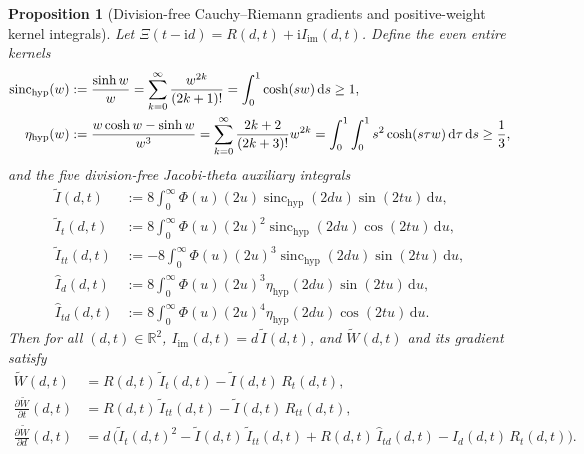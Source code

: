 \documentclass[11pt,a4paper,reqno]{amsart}
\newtheorem{proposition}[theorem]{Proposition}
\theoremstyle{definition}
\theoremstyle{remark}
\numberwithin{equation}{section}
\newcommand{\dd}{\mathrm{d}}
\newcommand{\ii}{\mathrm{i}}
\newcommand{\Wtil}{\widetilde{W}}
\newcommand{\sinch}{\operatorname{sinc}_{\mathrm{hyp}}}
\newcommand{\etah}{\eta_{\mathrm{hyp}}}
\newcommand{\fac}{\mathclose{\mathchar"0021}}
\begin{document}
\begin{proposition}[Division-free Cauchy--Riemann gradients and positive-weight kernel integrals]\label{prop:cr_gradients}
Let $\Xi(t-\ii d) = R(d,t) + \ii I_{\mathrm{im}}(d,t)$. Define the even entire kernels
\begin{equation}\label{eq:sinch_etah_def}
\begin{aligned}
\sinch(w) &:= \frac{\sinh w}{w} = \sum_{k=0}^\infty \frac{w^{2k}}{(2k+1)\fac} = \int_0^1 \cosh(s w)\,\dd s \ge 1, \\
\etah(w) &:= \frac{w\cosh w - \sinh w}{w^3} = \sum_{k=0}^\infty \frac{2k+2}{(2k+3)\fac}w^{2k} = \int_0^1\int_0^1 s^2\cosh(s\tau w)\,\dd\tau\,\dd s \ge \frac{1}{3},
\end{aligned}
\end{equation}
and the five division-free Jacobi-theta auxiliary integrals
\begin{equation}\label{eq:aux_integrals}
\begin{aligned}
\widetilde{I}(d,t) &:= 8\int_0^\infty \Phi(u)(2u)\sinch(2d u)\sin(2t u)\,\dd u, \\
\widetilde{I}_t(d,t) &:= 8\int_0^\infty \Phi(u)(2u)^2\sinch(2d u)\cos(2t u)\,\dd u, \\
\widetilde{I}_{tt}(d,t) &:= -8\int_0^\infty \Phi(u)(2u)^3\sinch(2d u)\sin(2t u)\,\dd u, \\
\widehat{I}_d(d,t) &:= 8\int_0^\infty \Phi(u)(2u)^3\etah(2d u)\sin(2t u)\,\dd u, \\
\widehat{I}_{td}(d,t) &:= 8\int_0^\infty \Phi(u)(2u)^4\etah(2d u)\cos(2t u)\,\dd u.
\end{aligned}
\end{equation}
Then for all $(d,t) \in \mathbb{R}^2$, $I_{\mathrm{im}}(d,t) = d\,\widetilde{I}(d,t)$, and $\Wtil(d,t)$ and its gradient satisfy
\begin{align}
\Wtil(d,t) &= R(d,t)\,\widetilde{I}_t(d,t) - \widetilde{I}(d,t)\,R_t(d,t), \label{eq:Wtil_divfree} \\
\frac{\partial \Wtil}{\partial t}(d,t) &= R(d,t)\,\widetilde{I}_{tt}(d,t) - \widetilde{I}(d,t)\,R_{tt}(d,t), \label{eq:dWtil_dt_divfree} \\
\frac{\partial \Wtil}{\partial d}(d,t) &= d\,\Big(\widetilde{I}_t(d,t)^2 - \widetilde{I}(d,t)\,\widetilde{I}_{tt}(d,t) + R(d,t)\,\widehat{I}_{td}(d,t) - \widehat{I}_d(d,t)\,R_t(d,t)\Big). \label{eq:dWtil_dd_divfree}
\end{align}
\end{proposition}
\end{document}
